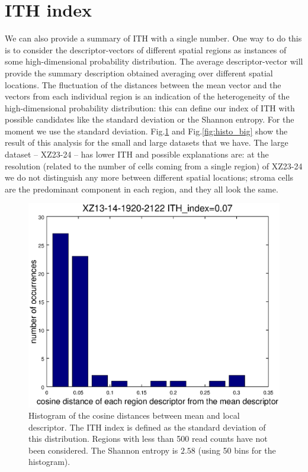 \documentclass[11pt,a4paper]{article}
\begin{document}
\section{ITH index}
We can also provide a summary of ITH with a single number. One way to do this is to consider the descriptor-vectors of  different spatial regions as instances of some high-dimensional probability distribution. The average descriptor-vector will provide the summary description obtained averaging over different spatial locations. The fluctuation of the distances between the mean vector and the vectors from each individual region is an indication of the heterogeneity of the high-dimensional probability distribution: this can define our index of ITH with possible candidates like the standard deviation or the Shannon entropy. For the moment we use the standard deviation. Fig.\ref{fig:histo_small} and Fig.\ref{fig:histo_big} show the result of this analysis for the small and large datasets that we have. The large dataset -- XZ23-24 -- has lower ITH and possible explanations are: at the resolution (related to the number of cells coming from a single region) of XZ23-24 we do not distinguish any more between different spatial locations; stroma cells are the predominant component in each region, and they all look the same. 
		
\begin{figure}[hbtp]
\centering
\includegraphics[scale=0.5]{histo_xz131419202122.eps}
\caption{Histogram of the cosine distances between mean and local descriptor. The ITH index is defined as the standard deviation of this distribution. Regions with less than 500 read counts have not been considered. The Shannon entropy is $2.58$ (using 50 bins for the histogram).}
\label{fig:histo_small}
\end{figure}
\end{document}
